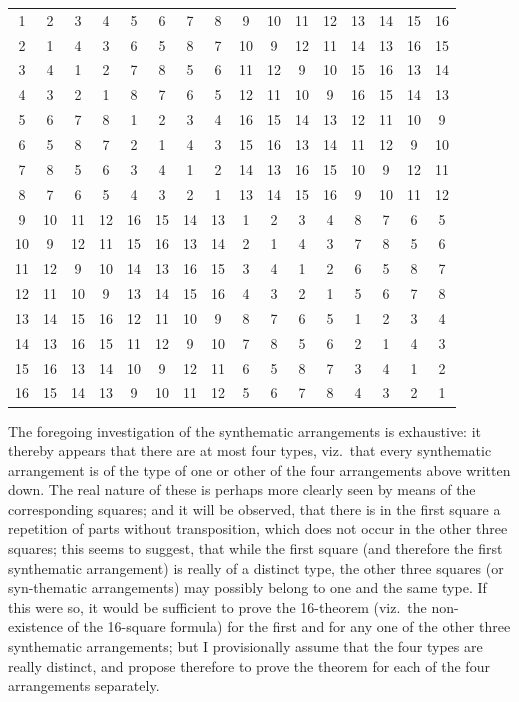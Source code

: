 \documentclass[11pt]{article}
\begin{document}
\begin{center}
\begin{tabular}{cccc|cccc|cccc|cccc}
1 & 2 & 3 & 4 & 5 & 6 & 7 & 8 & 9 & 10 & 11 & 12 & 13 & 14 & 15 & 16 \\
2 & 1 & 4 & 3 & 6 & 5 & 8 & 7 & 10 & 9 & 12 & 11 & 14 & 13 & 16 & 15 \\
3 & 4 & 1 & 2 & 7 & 8 & 5 & 6 & 11 & 12 & 9 & 10 & 15 & 16 & 13 & 14 \\
4 & 3 & 2 & 1 & 8 & 7 & 6 & 5 & 12 & 11 & 10 & 9 & 16 & 15 & 14 & 13 \\
\hline
5 & 6 & 7 & 8 & 1 & 2 & 3 & 4 & 16 & 15 & 14 & 13 & 12 & 11 & 10 & 9 \\
6 & 5 & 8 & 7 & 2 & 1 & 4 & 3 & 15 & 16 & 13 & 14 & 11 & 12 & 9 & 10 \\
7 & 8 & 5 & 6 & 3 & 4 & 1 & 2 & 14 & 13 & 16 & 15 & 10 & 9 & 12 & 11 \\
8 & 7 & 6 & 5 & 4 & 3 & 2 & 1 & 13 & 14 & 15 & 16 & 9 & 10 & 11 & 12 \\
\hline
9 & 10 & 11 & 12 & 16 & 15 & 14 & 13 & 1 & 2 & 3 & 4 & 8 & 7 & 6 & 5 \\
10 & 9 & 12 & 11 & 15 & 16 & 13 & 14 & 2 & 1 & 4 & 3 & 7 & 8 & 5 & 6 \\
11 & 12 & 9 & 10 & 14 & 13 & 16 & 15 & 3 & 4 & 1 & 2 & 6 & 5 & 8 & 7 \\
12 & 11 & 10 & 9 & 13 & 14 & 15 & 16 & 4 & 3 & 2 & 1 & 5 & 6 & 7 & 8 \\
\hline
13 & 14 & 15 & 16 & 12 & 11 & 10 & 9 & 8 & 7 & 6 & 5 & 1 & 2 & 3 & 4 \\
14 & 13 & 16 & 15 & 11 & 12 & 9 & 10 & 7 & 8 & 5 & 6 & 2 & 1 & 4 & 3 \\
15 & 16 & 13 & 14 & 10 & 9 & 12 & 11 & 6 & 5 & 8 & 7 & 3 & 4 & 1 & 2 \\
16 & 15 & 14 & 13 & 9 & 10 & 11 & 12 & 5 & 6 & 7 & 8 & 4 & 3 & 2 & 1 \\
\end{tabular}
\end{center}

The foregoing investigation of the synthematic arrangements is exhaustive: it
thereby appears that there are at most four types, viz.\ that every synthematic
arrangement is of the type of one or other of the four arrangements above written
down. The real nature of these is perhaps more clearly seen by means of the
corresponding squares; and it will be observed, that there is in the first square a
repetition of parts without transposition, which does not occur in the other three
squares; this seems to suggest, that while the first square (and therefore the first
synthematic arrangement) is really of a distinct type, the other three squares (or syn-thematic
arrangements) may possibly belong to one and the same type. If this were
so, it would be sufficient to prove the 16-theorem (viz.\ the non-existence of the
16-square formula) for the first and for any one of the other three synthematic
arrangements; but I provisionally assume that the four types are really distinct, and
propose therefore to prove the theorem for each of the four arrangements separately.
\end{document}
